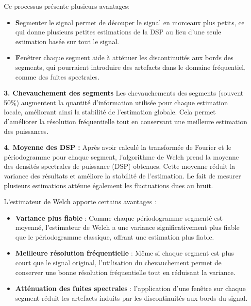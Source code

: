 Ce processus présente plusieurs avantages:
\begin{itemize}
    \item \textbf Segmenter le signal permet de découper le signal en morceaux plus petits, ce qui donne plusieurs petites estimations de la DSP au lieu d'une seule estimation basée sur tout le signal.
    \item \textbf Fenêtrer chaque segment aide à atténuer les discontinuités aux bords des segments, qui pourraient introduire des artefacts dans le domaine fréquentiel, comme des fuites spectrales.
\end{itemize}

\textbf{3. Chevauchement des segments}
Les chevauchements des segments (souvent 50\%) augmentent la quantité d'information utilisée pour chaque estimation locale, améliorant ainsi la stabilité de l'estimation globale. 
Cela permet d'améliorer la résolution fréquentielle tout en conservant une meilleure estimation des puissances.

\textbf{4. Moyenne des DSP :}
Après avoir calculé la transformée de Fourier et le périodogramme pour chaque segment, l'algorithme de Welch prend la moyenne des densités spectrales de puissance (DSP) obtenues. 
Cette moyenne réduit la variance des résultats et améliore la stabilité de l'estimation. 
Le fait de mesurer plusieurs estimations atténue également les fluctuations dues au bruit.

L'estimateur de Welch apporte certains avantages : 
\begin{itemize}
    \item  \textbf{Variance plus fiable} : Comme chaque périodogramme segmenté est moyenné, l'estimateur de Welch a une variance significativement plus fiable que le périodogramme classique, offrant une estimation plus fiable.
    \item \textbf{Meilleure résolution fréquentielle} : Même si chaque segment est plus court que le signal original, l'utilisation du chevauchement permet de conserver une bonne résolution fréquentielle tout en réduisant la variance.
    \item  \textbf{Atténuation des fuites spectrales} : l'application d'une fenêtre sur chaque segment réduit les artefacts induits par les discontinuités aux bords du signal.
\end{itemize}

